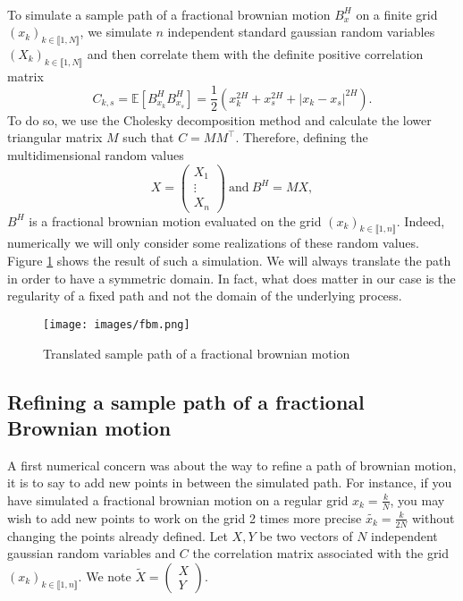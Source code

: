 \documentclass[11pt]{article}
\newcommand{\E}{\mathbb{E}}
\begin{document}
\paragraph{}
To simulate a sample path of a fractional brownian motion $B^H_x$ on a finite grid $(x_k)_{k\in\llbracket1,N\rrbracket}$, we simulate $n$ independent standard gaussian random variables $(X_k)_{k\in\llbracket1,N\rrbracket}$ and then correlate them with the definite positive correlation matrix 
$$C_{k,s}=\E\left[B_{x_k}^HB_{x_s}^H\right]=\frac{1}{2}\left(x_k^{2H}+x_s^{2H}+|x_k-x_s|^{2H}\right).$$
To do so, we use the Cholesky decomposition method and calculate the lower triangular matrix $M$ such that $C=MM^\top$. Therefore, defining the multidimensional random values
$$X = \begin{pmatrix}
X_1 \\ \vdots \\ X_n
\end{pmatrix}\ \mathrm{and}\ B^H = MX,$$
$B^H$ is a fractional brownian motion evaluated on the grid $(x_k)_{k\in\llbracket1,n\rrbracket}$. Indeed, numerically we will only consider some realizations of these random values. Figure \ref{fbm} shows the result of such a simulation. We will always translate the path in order to have a symmetric domain. In fact, what does matter in our case is the regularity of a fixed path and not the domain of the underlying process.

\begin{figure}
    \centering
    \texttt{[image: images/fbm.png]}
    \caption{ \label{fbm} Translated sample path of a fractional brownian motion}
\end{figure}

\subsection{Refining a sample path of a fractional Brownian motion}

A first numerical concern was about the way to refine a path of brownian motion, it is to say to add new points in between the simulated path. For instance, if you have simulated a fractional brownian motion on a regular grid $x_k = \frac{k}{N}$, you may wish to add new points to work on the grid 2 times more precise $\widetilde{x_k} = \frac{k}{2N}$ without changing the points already defined. Let $X,Y$ be two vectors of $N$ independent gaussian random variables and $C$ the correlation matrix associated with the grid $(x_k)_{k\in\llbracket1,n\rrbracket}$. We note $\widetilde{X} = \begin{pmatrix}
X \\ Y
\end{pmatrix}$.
\end{document}
